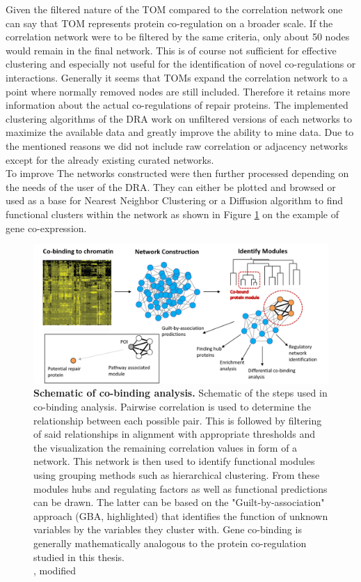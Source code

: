 Given the filtered nature of the TOM compared to the correlation network one can say that TOM represents protein co-regulation on a broader scale. If the correlation network were to be filtered by the same criteria, only about 50 nodes would remain in the final network. This is of course not sufficient for effective clustering and especially not useful for the identification of novel co-regulations or interactions. Generally it seems that TOMs expand the correlation network to a point where normally removed nodes are still included. Therefore it retains more information about the actual co-regulations of repair proteins. The implemented clustering algorithms of the DRA work on unfiltered versions of each networks to maximize the available data and greatly improve the ability to mine data. Due to the mentioned reasons we did not include raw correlation or adjacency networks except for the already existing curated networks.\\
To improve 
The networks constructed were then further processed depending on the needs of the user of the DRA. They can either be plotted and browsed or used as a base for Nearest Neighbor Clustering or a Diffusion algorithm to find functional clusters within the network as shown in Figure \ref{fig:co-expression} on the example of gene co-expression.
\begin{figure}[H]
    \centering
    \includegraphics[width=.98\textwidth]{resources/images/Intro/co-expression.png}
    \caption[Schematic of co-binding analysis]{\textbf{Schematic of co-binding analysis. }Schematic of the steps used in co-binding analysis. Pairwise correlation is used to determine the relationship between each possible pair. This is followed by filtering of said relationships in alignment with appropriate thresholds and the visualization the remaining correlation values in form of a network. This network is then used to identify functional modules using grouping methods such as hierarchical clustering. From these modules hubs and regulating factors as well as functional predictions can be drawn. The latter can be based on the "Guilt-by-association" approach (GBA, highlighted) that identifies the function of unknown variables by the variables they cluster with. Gene co-binding is generally mathematically analogous to the protein co-regulation studied in this thesis.\\\cite{vanDam.2018}, modified}
    \label{fig:co-expression}
\end{figure}
